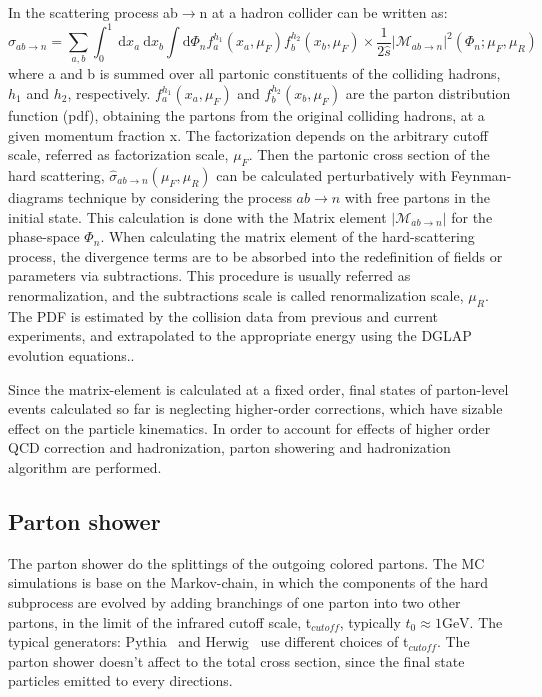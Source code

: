 In the scattering process ab$\rightarrow$n at a hadron collider can be written as:
\begin{equation}
\label{eqn:qcdxsec}
\sigma_{a b \rightarrow n}=\sum_{a, b} \int_{0}^{1} \mathrm{~d} x_{a} \mathrm{~d} x_{b} \int \mathrm{d} \Phi_{n} f_{a}^{h_{1}}\left(x_{a}, \mu_{F}\right) f_{b}^{h_{2}}\left(x_{b}, \mu_{F}\right) \times \frac{1}{2 \hat{s}}\left|\mathcal{M}_{a b \rightarrow n}\right|^{2}\left(\Phi_{n} ; \mu_{F}, \mu_{R}\right)
\end{equation}
where a and b is summed over all partonic constituents of the colliding hadrons, $h_1$ and $h_2$, respectively.
$f_{a}^{h_{1}}\left(x_{a}, \mu_{F}\right)$ and $f_{b}^{h_{2}}\left(x_{b}, \mu_{F}\right)$ are the parton distribution function (pdf), obtaining the partons from the original colliding hadrons, at a given momentum fraction x. The factorization depends on the arbitrary cutoff scale, referred as factorization scale, $\mu_F$.
Then the partonic cross section of the hard scattering, $\hat{\sigma}_{a b \rightarrow n}\left(\mu_{F}, \mu_{R}\right)$ can be calculated perturbatively with Feynman-diagrams technique by considering the process $ab\rightarrow n $ with free partons in the initial state. This calculation is done with the Matrix element $\left|\mathcal{M}_{a b \rightarrow n}\right|$ for the phase-space $\Phi_n$.
When calculating the matrix element of the hard-scattering process, the divergence terms are to be absorbed into the redefinition of fields or parameters via subtractions. This procedure is usually referred as renormalization, and the subtractions scale is called renormalization scale, $\mu_R$. 
The PDF is estimated by the collision data from previous and current experiments, and extrapolated to the appropriate energy using the DGLAP evolution equations.\cite{}.

Since the matrix-element is calculated at a fixed order, final states of parton-level events calculated so far is neglecting higher-order corrections, which have sizable effect on the particle kinematics. In order to account for effects of higher order QCD correction and hadronization, parton showering and hadronization algorithm are performed.

\subsection{Parton shower}
\label{subsec:partonshower}

The parton shower do the splittings of the outgoing colored partons.  The MC simulations is base on the Markov-chain, in which the components of the hard subprocess are evolved by adding branchings of one parton into two other partons, in the limit of the infrared cutoff scale, t$_{cutoff}$, typically $t_{0} \approx 1 \mathrm{GeV}$. The typical generators: Pythia~\cite{SJOSTRAND2008852} and Herwig~\cite{Gieseke2012} use different choices of t$_{cutoff}$.
The parton shower doesn't affect to the total cross section, since the final state particles emitted to every directions.
